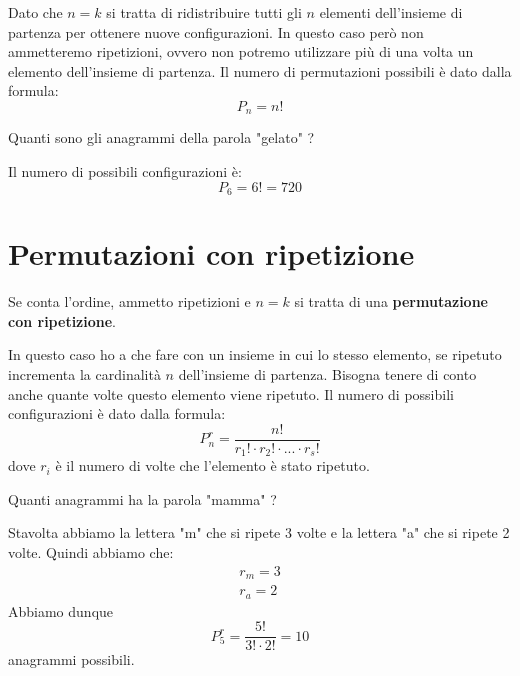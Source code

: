 Dato che $n = k$ si tratta di ridistribuire tutti gli $n$ elementi dell'insieme di partenza per
ottenere nuove configurazioni. In questo caso per\`o non ammetteremo ripetizioni, ovvero non
potremo utilizzare pi\`u di una volta un elemento dell'insieme di partenza.
Il numero di permutazioni possibili \`e dato dalla formula:
\begin{equation*}
	P_n = n!
\end{equation*}

\begin{example}
	Quanti sono gli anagrammi della parola "gelato" ?

	Il numero di possibili configurazioni \`e:
	\begin{equation*}
		P_{6} = 6! = 720
	\end{equation*}
\end{example}

\section{Permutazioni con ripetizione}
\begin{definition}
	Se conta l'ordine, ammetto ripetizioni e $n = k$ si tratta di una
	\textbf{permutazione con ripetizione}.
\end{definition}

In questo caso ho a che fare con un insieme in cui lo stesso elemento, se ripetuto incrementa
la cardinalit\`a $n$ dell'insieme di partenza. Bisogna tenere di conto anche quante volte
questo elemento viene ripetuto.
Il numero di possibili configurazioni \`e dato dalla formula:
\begin{equation*}
	P_n^r = \frac{n!}{r_1! \cdot r_2! \cdot ... \cdot r_s!}
\end{equation*}
dove $r_i$ \`e il numero di volte che l'elemento \`e stato ripetuto.

\begin{example}
	Quanti anagrammi ha la parola "mamma" ?

	Stavolta abbiamo la lettera "m" che si ripete 3 volte e la lettera "a" che si ripete 2 volte.
	Quindi abbiamo che:
	\begin{equation*}
		\begin{array}{c}
			r_m = 3 \\
			r_a = 2
		\end{array}
	\end{equation*}
	Abbiamo dunque
	\begin{equation*}
		P_5^r = \frac{5!}{3! \cdot 2!} = 10
	\end{equation*}
	anagrammi possibili.
\end{example}

